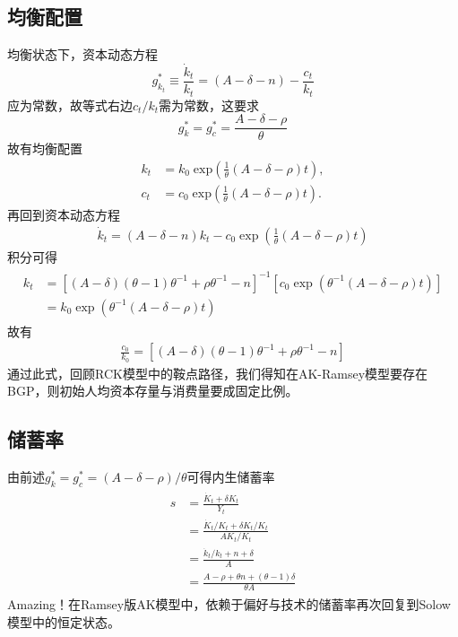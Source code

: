 \documentclass[cn,normal,11pt,black]{elegantnote}
\begin{document}
\subsection{均衡配置}
均衡状态下，资本动态方程
\begin{equation}
    g^*_{k_t} \equiv \frac{\dot{k}_t}{k_t} = (A-\delta - n) - \frac{c_t}{k_t}
\end{equation}
    应为常数，故等式右边$c_t/k_t$需为常数，这要求
\begin{equation}
     g^*_k =g_c^* = \frac{A - \delta - \rho}{\theta}
\end{equation}
故有均衡配置
\begin{align}
    k_t & = k_0 \; \mbox{exp} \left( \frac{1}{\theta} (A-\delta - \rho) t \right), \\
    c_t & = c_0 \; \mbox{exp} \left( \frac{1}{\theta} (A-\delta - \rho) t \right).
\end{align}
再回到资本动态方程
\begin{align}
    \dot{k}_t=(A-\delta-n) k_t-c_0 \exp \left(\frac{1}{\theta}(A-\delta-\rho) t\right)
\end{align}
积分可得
\begin{align}
    \begin{aligned} 
        k_t & = \left[(A-\delta)(\theta-1) \theta^{-1}+\rho \theta^{-1}-n\right]^{-1}
                \left[c_0 \exp \left(\theta^{-1}(A-\delta-\rho) t\right)\right] \\ 
            & = k_0 \exp \left(\theta^{-1}(A-\delta-\rho) t\right) 
    \end{aligned}
\end{align}
故有
\begin{align}
    \frac{c_0}{k_0}= \left[(A-\delta)(\theta-1) \theta^{-1}+\rho \theta^{-1}-n\right] 
\end{align}
通过此式，回顾RCK模型中的鞍点路径，我们得知在AK-Ramsey模型要存在BGP，则初始人均资本存量与消费量要成固定比例。

\subsection{储蓄率}
由前述$g^*_k = g_c^* = (A - \delta - \rho)/\theta$可得内生储蓄率
\begin{align}
\begin{aligned}
    s & = \frac{\dot{K}_t + \delta K_t}{Y_t} \\
      & = \frac{\dot{K}_t/K_t + \delta K_t/K_t}{AK_t/K_t} \\
      & = \frac{\dot{k}_t/k_t + n + \delta}{A} \\
      & = \frac{A - \rho + \theta n + (\theta - 1)\delta}{\theta A}
\end{aligned}
\end{align}
Amazing！在Ramsey版AK模型中，依赖于偏好与技术的储蓄率再次回复到Solow模型中的恒定状态。
\end{document}
